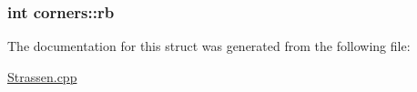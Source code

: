 \subsubsection[{\texorpdfstring{rb}{rb}}]{\setlength{\rightskip}{0pt plus 5cm}int corners\+::rb}\hypertarget{structcorners_ad19782e14b4b905dd685ce98fe6e718a}{}\label{structcorners_ad19782e14b4b905dd685ce98fe6e718a}


The documentation for this struct was generated from the following file\+:\begin{DoxyCompactItemize}
\item 
\hyperlink{Strassen_8cpp}{Strassen.\+cpp}\end{DoxyCompactItemize}
